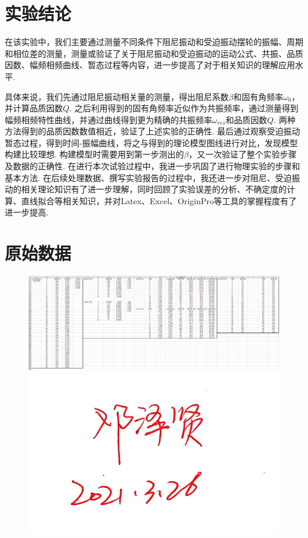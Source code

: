 \documentclass[UTF8]{ctexart}
\begin{document}
\section{实验结论}
在该实验中，我们主要通过测量不同条件下阻尼振动和受迫振动摆轮的振幅、周期和相位差的测量，测量或验证了关于阻尼振动和受迫振动的运动公式、共振、品质因数、幅频相频曲线、暂态过程等内容，进一步提高了对于相关知识的理解应用水平.\par
具体来说，我们先通过阻尼振动相关量的测量，得出阻尼系数$\beta$和固有角频率$\omega_0$，并计算品质因数$Q$. 之后利用得到的固有角频率近似作为共振频率，通过测量得到幅频相频特性曲线，并通过曲线得到更为精确的共振频率$\omega_{res}$和品质因数$Q$. 两种方法得到的品质因数数值相近，验证了上述实验的正确性. 最后通过观察受迫振动暂态过程，得到时间-振幅曲线，将之与得到的理论模型图线进行对比，发现模型构建比较理想. 构建模型时需要用到第一步测出的$\beta$，又一次验证了整个实验步骤及数据的正确性.\quad
在进行本次试验过程中，我进一步巩固了进行物理实验的步骤和基本方法. 在后续处理数据、撰写实验报告的过程中，我还进一步对阻尼、受迫振动的相关理论知识有了进一步理解，同时回顾了实验误差的分析、不确定度的计算、直线拟合等相关知识，并对Latex、Excel、OriginPro等工具的掌握程度有了进一步提高.
\section{原始数据}
\vspace{0mm}
\begin{figure}[H]
\begin{center}
\includegraphics[scale=0.5]{data1.PNG}
\end{center}\vspace{0mm}
\begin{flushright}
\includegraphics[scale=0.10]{data2.jpg}\end{flushright}
\end{figure}
\end{document}
